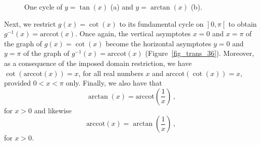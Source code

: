 \begin{figure}[h]
			\centering
\centerline{
\hspace{0.1cm}
}
	\caption{One cycle of $y=\tan(x)$ (a) and $y=\arctan(x)$ (b).}
	\label{fig_trans_35}
\end{figure}


Next, we restrict $g(x) = \cot(x)$ to its fundamental cycle on $\left.\right]0,\pi\left[\right.$ to obtain $g^{-1}(x) = \mbox{arccot}(x)$.  Once again, the vertical asymptotes $x=0$ and $x=\pi$ of the graph of $g(x) = \cot(x)$ become the horizontal asymptotes $y = 0$ and $y = \pi$ of the graph of $g^{-1}(x) = \mbox{arccot}(x)$ (Figure~\ref{fig_trans_36}). Moreover, as a consequence of the imposed domain restriction, we have $\cot\left(\mbox{arccot}(x)\right) = x$, for all real numbers $x$ and $\mbox{arccot}(\cot(x)) = x$, provided $0 < x < \pi$ only. Finally, we also have that
$$
\arctan(x) = \mbox{arccot}\left(\frac{1}{x}\right)\,,
$$
 for $x > 0$ and likewise
$$
\mbox{arccot}(x) =\arctan\left(\frac{1}{x}\right)\,,
$$
for $x > 0$.
  

